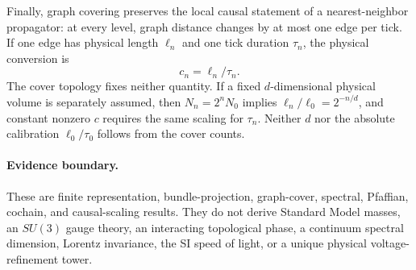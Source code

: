 Finally, graph covering preserves the local causal statement of a nearest-neighbor
propagator: at every level, graph distance changes by at most one edge per tick.
If one edge has physical length $\ell_n$ and one tick duration $\tau_n$, the
physical conversion is
\[
\boxed{c_n=\ell_n/\tau_n.}
\]
The cover topology fixes neither quantity.  If a fixed $d$-dimensional physical
volume is separately assumed, then $N_n=2^nN_0$ implies
$\ell_n/\ell_0=2^{-n/d}$, and constant nonzero $c$ requires the same scaling for
$\tau_n$.  Neither $d$ nor the absolute calibration $\ell_0/\tau_0$ follows from
the cover counts.

\paragraph{Evidence boundary.}
These are finite representation, bundle-projection, graph-cover, spectral,
Pfaffian, cochain, and causal-scaling results.  They do not derive Standard Model
masses, an $SU(3)$ gauge theory, an interacting topological phase, a continuum
spectral dimension, Lorentz invariance, the SI speed of light, or a unique physical
voltage-refinement tower.
